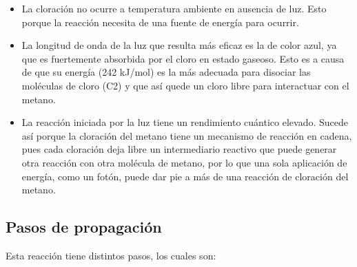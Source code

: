 \begin{itemize}
    \item La cloración no ocurre a temperatura ambiente en ausencia de luz. Esto porque la reacción necesita de una fuente de energía para ocurrir.
    \item La longitud de onda de la luz que resulta más eficaz es la de color azul, ya que es fuertemente absorbida por el cloro en estado gaseoso. Esto es a causa de que su energía (242 kJ/mol) es la más adecuada para disociar las moléculas de cloro (C2) y que así quede un cloro libre para interactuar con el metano.
    \item La reacción iniciada por la luz tiene un rendimiento cuántico elevado. Sucede así porque la cloración del metano tiene un mecanismo de reacción en cadena, pues cada cloración deja libre un intermediario reactivo que puede generar otra reacción con otra molécula de metano, por lo que una sola aplicación de energía, como un fotón, puede dar pie a más de una reacción de cloración del metano.
\end{itemize}

\subsection{Pasos de propagación}

Esta reacción tiene distintos pasos, los cuales son:

